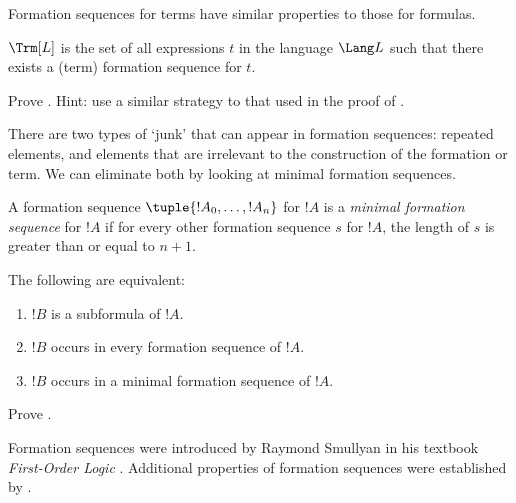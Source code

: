 \documentclass[../../../include/open-logic-section]{subfiles}
\begin{document}
Formation sequences for terms have similar properties to those
for formulas.

\begin{prop}
$\Trm[L]$ is the set of all expressions $t$ in the language
$\Lang L$ such that there exists a (term) formation sequence
for $t$.
\end{prop}

\begin{prob}
Prove .
Hint: use a similar strategy to that used in the proof of
.
\end{prob}

There are two types of `junk' that can appear in formation
sequences: repeated elements, and elements that are irrelevant
to the construction of the formation or term. We can eliminate
both by looking at minimal formation sequences.

\begin{defn}
A formation sequence $\tuple{!A_0,\dotsc,!A_n}$ for $!A$ is a
\emph{minimal formation sequence} for $!A$
if for every other formation sequence $s$ for $!A$, the length
of $s$ is greater than or equal to $n+1$.
\end{defn}

\begin{prop}
The following are equivalent:
\begin{enumerate}
    \item $!B$ is a subformula of $!A$.
    \item $!B$ occurs in every formation sequence of $!A$.
    \item $!B$ occurs in a minimal formation sequence of $!A$.
\end{enumerate}
\end{prop}

\begin{prob}
Prove .
\end{prob}

\begin{explain}
Formation sequences were introduced by Raymond Smullyan in his
textbook \emph{First-Order Logic} \citep{Smullyan1995}.
Additional properties of formation sequences were established by
\citet{Zuckerman1973}.
\end{explain}
\end{document}
